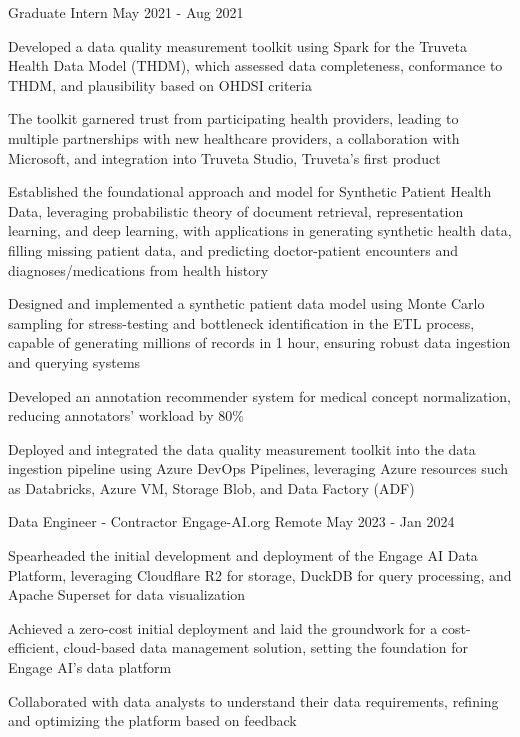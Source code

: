 \begin{cventries}
	\cventry
	{Graduate Intern}
	{}
	{}
	{May 2021 - Aug 2021}
	{\begin{cvitems}
			\item {Developed a data quality measurement toolkit using Spark for the Truveta Health Data Model (THDM), which assessed data completeness, conformance to THDM, and plausibility based on OHDSI criteria}
			\item {The toolkit garnered trust from participating health providers, leading to multiple partnerships with new healthcare providers, a collaboration with Microsoft, and integration into Truveta Studio, Truveta's first product}
			\item {Established the foundational approach and model for Synthetic Patient Health Data, leveraging probabilistic theory of document retrieval, representation learning, and deep learning, with applications in generating synthetic health data, filling missing patient data, and predicting doctor-patient encounters and diagnoses/medications from health history}
			\item {Designed and implemented a synthetic patient data model using Monte Carlo sampling for stress-testing and bottleneck identification in the ETL process, capable of generating millions of records in 1 hour, ensuring robust data ingestion and querying systems}
			\item {Developed an annotation recommender system for medical concept normalization, reducing annotators' workload by 80\%}
			\item {Deployed and integrated the data quality measurement toolkit into the data ingestion pipeline using Azure DevOps Pipelines, leveraging Azure resources such as Databricks, Azure VM, Storage Blob, and Data Factory (ADF)}
		\end{cvitems}}

	\cventry
	{Data Engineer - Contractor}
	{Engage-AI.org}
	{Remote}
	{May 2023 - Jan 2024}
	{\begin{cvitems}
			\item {Spearheaded the initial development and deployment of the Engage AI Data Platform, leveraging Cloudflare R2 for storage, DuckDB for query processing, and Apache Superset for data visualization}
			\item {Achieved a zero-cost initial deployment and laid the groundwork for a cost-efficient, cloud-based data management solution, setting the foundation for Engage AI's data platform}
			\item {Collaborated with data analysts to understand their data requirements, refining and optimizing the platform based on feedback}
		\end{cvitems}}


\end{cventries}
